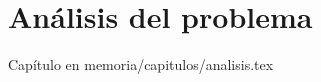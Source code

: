 \chapter{Análisis del problema}\label{ch:cuarto-capitulo}
    
    Capítulo en memoria/capitulos/analisis.tex

\endinput